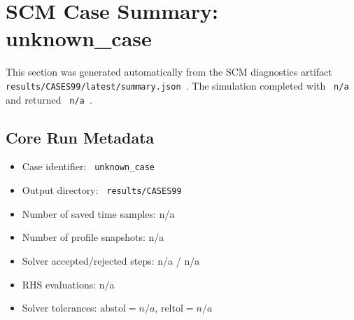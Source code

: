 \section{SCM Case Summary: unknown\_case}
\label{sec:scm_case_cases99_scm_case_report}

This section was generated automatically from the SCM diagnostics artifact
\texttt{ results/CASES99/latest/summary.json }. The simulation completed with \texttt{ n/a }
and returned \texttt{ n/a }.

\subsection{Core Run Metadata}
\begin{itemize}
  \item Case identifier: \texttt{ unknown\_case }
  \item Output directory: \texttt{ results/CASES99 }
  \item Number of saved time samples: n/a
  \item Number of profile snapshots: n/a
  \item Solver accepted/rejected steps: n/a / n/a
  \item RHS evaluations: n/a
  \item Solver tolerances: $\mathrm{abstol}=n/a$, $\mathrm{reltol}=n/a$
\end{itemize}

